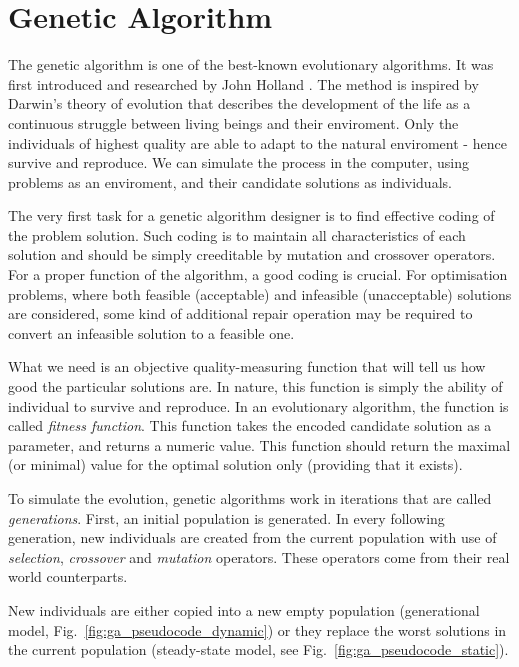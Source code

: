 \section{Genetic Algorithm}

The genetic algorithm is one of the best-known evolutionary algorithms. It was first introduced and researched by John Holland \cite{ga}. The method is inspired by Darwin's theory of evolution \cite{darwin} that describes the development of the life as a continuous struggle between living beings and their enviroment. Only the individuals of highest quality are able to adapt to the natural enviroment - hence survive and reproduce. We can simulate the process in the computer, using problems as an enviroment, and their candidate solutions as individuals.

The very first task for a genetic algorithm designer is to find effective coding of the problem solution. Such coding is to maintain all characteristics of each solution and should be simply creeditable by mutation and crossover operators. For a proper function of the algorithm, a good coding is crucial. For optimisation problems, where both feasible (acceptable) and infeasible (unacceptable) solutions are considered, some kind of additional repair operation may be required to convert an infeasible solution to a feasible one.

What we need is an objective quality-measuring function that will tell us how good the particular solutions are. In nature, this function is simply the ability of individual to survive and reproduce. In an evolutionary algorithm, the function is called {\em fitness function}. This function takes the encoded candidate solution as a parameter, and returns a numeric value. This function should return the maximal (or minimal) value for the optimal solution only (providing that it exists).

To simulate the evolution, genetic algorithms work in iterations that are called {\em generations}. First, an initial population is generated. In every following generation, new individuals are created from the current population with use of {\em selection}, {\em crossover} and {\em mutation} operators. These operators come from their real world counterparts.

New individuals are either copied into a new empty population (generational model, Fig.~\ref{fig:ga_pseudocode_dynamic}) or they replace the worst solutions in the current population (steady-state model, see Fig.~\ref{fig:ga_pseudocode_static}).

